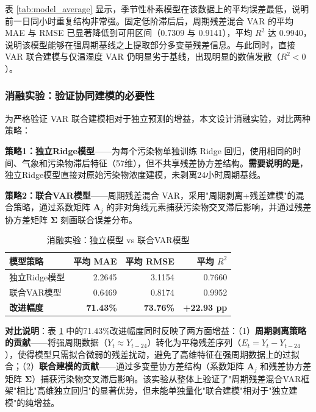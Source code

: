 \documentclass[UTF8,a4paper,12pt]{ctexart}
\begin{document}
表 \ref{tab:model_average} 显示，季节性朴素模型在该数据上的平均误差最低，说明前一日同小时重复结构非常强。固定低阶滞后后，周期残差混合 VAR 的平均 MAE 与 RMSE 已显著降低到可用区间（0.7309 与 0.9141），平均 $R^2$ 达 0.9940，说明该模型能够在强周期基线之上提取部分多变量残差信息。与此同时，直接 VAR 联合建模与仅温湿度 VAR 仍明显劣于基线，出现明显的数值发散（$R^2 < 0$）。

\subsubsection{消融实验：验证协同建模的必要性}

为严格验证 VAR 联合建模相对于独立预测的增益，本文设计消融实验，对比两种策略：

\textbf{策略1：独立Ridge模型}——为每个污染物单独训练 Ridge 回归，使用相同的时间、气象和污染物滞后特征（57维），但不共享残差协方差结构。\textbf{需要说明的是}，独立Ridge模型直接对原始污染物浓度建模，未剥离24小时周期基线。

\textbf{策略2：联合VAR模型}——周期残差混合 VAR，采用"周期剥离+残差建模"的混合策略，通过系数矩阵 $\mathbf{A}_j$ 的非对角线元素捕获污染物交叉滞后影响，并通过残差协方差矩阵 $\boldsymbol{\Sigma}$ 刻画联合误差分布。

\begin{table}[H]
\centering
\caption{消融实验：独立模型 vs 联合VAR模型}
\label{tab:ablation}
\small
\begin{tabular}{lrrr}
\toprule
模型策略 & 平均 MAE & 平均 RMSE & 平均 $R^2$\\
\midrule
独立Ridge模型 & 2.2645 & 3.1154 & 0.7660\\
联合VAR模型 & 0.6469 & 0.8174 & 0.9952\\
\midrule
\textbf{改进幅度} & \textbf{71.43\%} & \textbf{73.76\%} & \textbf{+22.93 pp}\\
\bottomrule
\end{tabular}
\end{table}

\textbf{对比说明}：表 \ref{tab:ablation} 中的71.43\%改进幅度同时反映了两方面增益：（1）\textbf{周期剥离策略的贡献}——将强周期数据（$Y_t \approx Y_{t-24}$）转化为平稳残差序列（$E_t = Y_t - Y_{t-24}$），使得模型只需拟合微弱的残差扰动，避免了高维特征在强周期数据上的过拟合；（2）\textbf{联合建模的贡献}——通过多变量协方差结构（系数矩阵 $\mathbf{A}_j$ 和残差协方差矩阵 $\boldsymbol{\Sigma}$）捕获污染物交叉滞后影响。该实验从整体上验证了"周期残差混合VAR框架"相比"高维独立回归"的显著优势，但未能单独量化"联合建模"相对于"独立建模"的纯增益。
\end{document}
